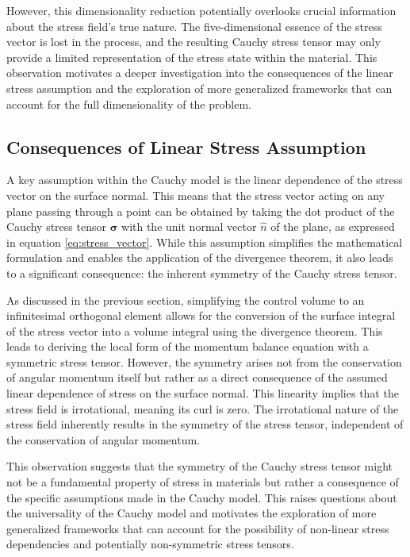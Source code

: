 \documentclass[12pt,a4paper,english]{article}
\begin{document}
However, this dimensionality reduction potentially overlooks crucial information about the stress field's true nature. The five-dimensional essence of the stress vector is lost in the process, and the resulting Cauchy stress tensor may only provide a limited representation of the stress state within the material. This observation motivates a deeper investigation into the consequences of the linear stress assumption and the exploration of more generalized frameworks that can account for the full dimensionality of the problem.

\subsection{Consequences of Linear Stress Assumption}

A key assumption within the Cauchy model is the linear dependence of the stress vector on the surface normal. This means that the stress vector acting on any plane passing through a point can be obtained by taking the dot product of the Cauchy stress tensor $\boldsymbol{\sigma}$ with the unit normal vector $\hat{n}$ of the plane, as expressed in equation \ref{eq:stress_vector}. While this assumption simplifies the mathematical formulation and enables the application of the divergence theorem, it also leads to a significant consequence: the inherent symmetry of the Cauchy stress tensor.

As discussed in the previous section, simplifying the control volume to an infinitesimal orthogonal element allows for the conversion of the surface integral of the stress vector into a volume integral using the divergence theorem. This leads to deriving the local form of the momentum balance equation with a symmetric stress tensor. However, the symmetry arises not from the conservation of angular momentum itself but rather as a direct consequence of the assumed linear dependence of stress on the surface normal. This linearity implies that the stress field is irrotational, meaning its curl is zero. The irrotational nature of the stress field inherently results in the symmetry of the stress tensor, independent of the conservation of angular momentum.

This observation suggests that the symmetry of the Cauchy stress tensor might not be a fundamental property of stress in materials but rather a consequence of the specific assumptions made in the Cauchy model. This raises questions about the universality of the Cauchy model and motivates the exploration of more generalized frameworks that can account for the possibility of non-linear stress dependencies and potentially non-symmetric stress tensors.
\end{document}
